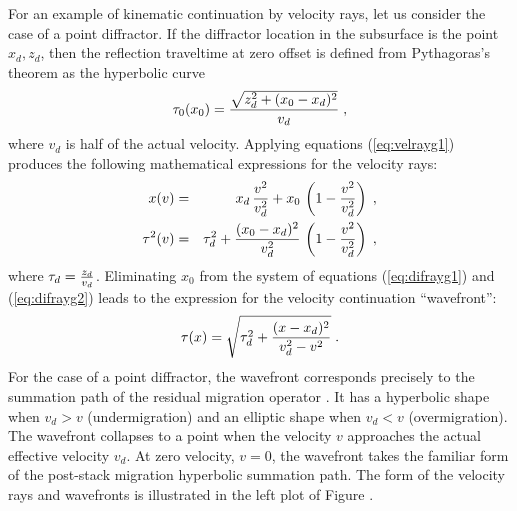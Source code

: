 For an example of kinematic continuation by velocity rays, let us
consider the case of a point diffractor. If the diffractor location in
the subsurface is the point ${x_d,z_d}$, then the reflection traveltime at
zero offset is defined from Pythagoras's theorem as the hyperbolic
curve
\begin{equation}
\tau_0(x_0) = {{\sqrt{z_d^2 + (x_0 - x_d)^2}} \over v_d}\;,
\label{eq:dift0}
\end{equation}
where $v_d$ is half of the actual velocity. Applying equations
(\ref{eq:velrayg1}) produces the following mathematical expressions
for the velocity rays:
\begin{eqnarray}
x(v) & = & x_d\,{v^2 \over v_d^2} + 
x_0\,\left(1 -  {v^2 \over v_d^2}\right)\;,
\label{eq:difrayg1} \\ 
\tau^2(v) & = & \tau_d^2 + {{(x_0 - x_d)^2} \over v_d^2}\,
\left(1 -  {v^2 \over v_d^2}\right)\;,
\label{eq:difrayg2} 
\end{eqnarray}
where $\tau_d = {z_d \over v_d}$.
Eliminating $x_0$ from the system of equations (\ref{eq:difrayg1}) and
(\ref{eq:difrayg2}) leads to the expression for the velocity continuation
``wavefront'': 
\begin{equation}
\tau(x)=\sqrt{\tau_d^2 + {{(x - x_d)^2} \over {v_d^2 - v^2}}}\;.
\label{eq:diffront}
\end{equation}
For the case of a point diffractor, the wavefront corresponds precisely
to the summation path of the residual migration operator
\cite[]{GEO50.01.01100126}. It has a hyperbolic shape when $v_d > v$
(undermigration) and an elliptic shape when $v_d < v$
(overmigration). The wavefront collapses to a point when the velocity
$v$ approaches the actual effective velocity $v_d$. At zero
velocity, $v=0$, the wavefront takes the familiar form of the post-stack migration
hyperbolic summation path. The form of the velocity rays and wavefronts
is illustrated in the left plot of Figure .


